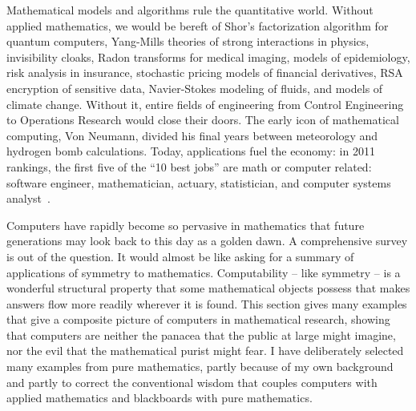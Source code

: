 \documentclass{llncs}
\begin{document}
Mathematical models and algorithms rule the quantitative world.
Without applied mathematics, we would be bereft of Shor's
factorization algorithm for quantum computers, Yang-Mills theories of
strong interactions in physics, invisibility cloaks, Radon transforms
for medical imaging, models of epidemiology, risk analysis in
insurance, stochastic pricing models of financial derivatives, RSA
encryption of sensitive data, Navier-Stokes modeling of fluids, and
models of climate change.
Without it, entire fields of engineering from Control Engineering to
Operations Research would close their doors.  The early icon of
mathematical computing, Von Neumann, divided his final years between
meteorology and hydrogen bomb calculations.
Today, applications fuel the
economy: in 2011 rankings, the first five of the ``10 best jobs'' are
math or computer related: software engineer, mathematician, actuary,
statistician, and computer systems analyst~\cite{CC11}.  








\bigskip

Computers have rapidly become so pervasive in mathematics that future
generations may look back to this day as a golden dawn.  A
comprehensive survey is out of the question.  It would almost be like
asking for a summary of applications of symmetry to mathematics.
Computability -- like symmetry -- is a wonderful structural property
that some mathematical objects possess that makes answers flow more
readily wherever it is found.  This section gives many examples that
give a composite picture of computers in mathematical research,
showing that computers are neither the panacea that the public at
large might imagine, nor the evil that the mathematical purist might
fear.  I have deliberately selected many examples from pure
mathematics, partly because of my own background and partly to correct
the conventional wisdom that couples computers with applied
mathematics and blackboards with pure mathematics.
\end{document}
